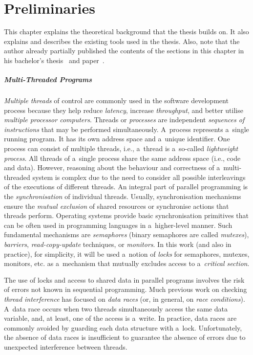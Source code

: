 

\chapter{Preliminaries}
\label{chap:prelim}

This chapter explains the theoretical background that the thesis builds on. It also explains and describes the existing tools used in the thesis. Also, note that the author already partially published the contents of the sections in this chapter in his bachelor's thesis~\cite{harmimBP} and paper~\cite{excel2021Harmim}.

\paragraph{Multi-Threaded Programs~\cite{atomizer, muzikovskaBP}}
\emph{Multiple threads} of control are commonly used in the software development process because they help reduce \emph{latency}, increase \emph{throughput}, and better utilise \emph{multiple processor computers}. Threads or \emph{processes} are independent \emph{sequences of instructions} that may be performed simultaneously. A~process represents a~single running program. It has its own address space and a~unique identifier. One process can consist of multiple threads, i.e., a~thread is a~so-called \emph{lightweight process}. All threads of a~single process share the same address space (i.e., code and data). However, reasoning about the behaviour and correctness of a~multi-threaded system is complex due to the need to consider all possible interleavings of the executions of different threads. An integral part of parallel programming is the \emph{synchronisation} of individual threads. Usually, synchronisation mechanisms ensure the \emph{mutual exclusion} of shared resources or synchronise actions that threads perform. Operating systems provide basic synchronisation primitives that can be often used in programming languages in a~higher-level manner. Such fundamental mechanisms are \emph{semaphores} (binary semaphores are called \emph{mutexes}), \emph{barriers}, \emph{read-copy-update} techniques, or \emph{monitors}. In this work (and also in practice), for simplicity, it will be used a~notion of \emph{locks} for semaphores, mutexes, monitors, etc. as a~mechanism that mutually excludes access to a~\emph{critical section}.

The use of locks and access to shared data in parallel programs involves the risk of errors not known in sequential programming. Much previous work on checking \emph{thread interference} has focused on \emph{data races} (or, in general, on \emph{race conditions}). A~data race occurs when two threads simultaneously access the same data variable, and, at least, one of the access is a~write. In practice, data races are commonly avoided by guarding each data structure with a~lock. Unfortunately, the absence of data races is insufficient to guarantee the absence of errors due to unexpected interference between threads.~\cite{atomizer, atomicityOOP}

